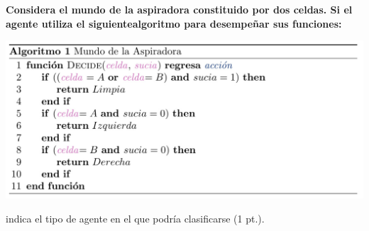 \textbf{Considera el mundo de la aspiradora constituido por dos celdas. Si el agente utiliza el siguientealgoritmo para desempeñar sus funciones:}

\includegraphics[width=16cm]{src/Img/Screenshot_20250224_024900.png}

indica el tipo de agente en el que podría clasificarse (1 pt.).